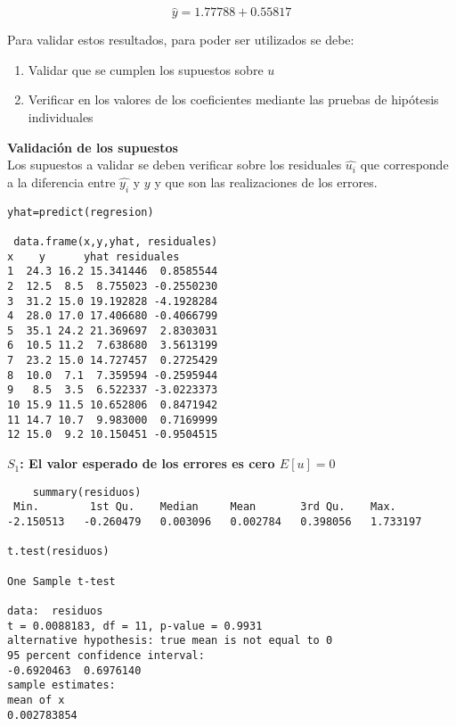 \documentclass[base=hide,12pt]{elegantbook}
\begin{document}
$$\widehat{y} = 1.77788 + 0.55817$$


Para validar estos resultados, para poder ser utilizados se debe:
\begin{enumerate}
	\item Validar que se cumplen los supuestos sobre $u$
	\item Verificar en los valores de los coeficientes mediante las pruebas de hipótesis individuales
\end{enumerate}

\vspace{.5cm}
\textcolor{col3}{\bf \large Validación de los supuestos}\\

Los supuestos a validar se deben verificar sobre los residuales $\widehat{u_{i}}$ que corresponde a la diferencia entre $\widehat{y_{i}}$ y $y$ y que son las realizaciones de los errores.

\begin{Box3}{}
\begin{verbatim}
yhat=predict(regresion)

 data.frame(x,y,yhat, residuales)
x    y      yhat residuales
1  24.3 16.2 15.341446  0.8585544
2  12.5  8.5  8.755023 -0.2550230
3  31.2 15.0 19.192828 -4.1928284
4  28.0 17.0 17.406680 -0.4066799
5  35.1 24.2 21.369697  2.8303031
6  10.5 11.2  7.638680  3.5613199
7  23.2 15.0 14.727457  0.2725429
8  10.0  7.1  7.359594 -0.2595944
9   8.5  3.5  6.522337 -3.0223373
10 15.9 11.5 10.652806  0.8471942
11 14.7 10.7  9.983000  0.7169999
12 15.0  9.2 10.150451 -0.9504515
\end{verbatim}	
\end{Box3}
\vspace{1cm}
\textcolor{col3}{\bf $S_1$: El valor esperado de los errores es cero $E[u]=0$}\\

\begin{Box3}{}
\begin{verbatim}
	summary(residuos)
 Min.        1st Qu.    Median     Mean       3rd Qu.    Max. 
-2.150513   -0.260479   0.003096   0.002784   0.398056   1.733197 

t.test(residuos)

One Sample t-test

data:  residuos
t = 0.0088183, df = 11, p-value = 0.9931
alternative hypothesis: true mean is not equal to 0
95 percent confidence interval:
-0.6920463  0.6976140
sample estimates:
mean of x 
0.002783854 
	
\end{verbatim}
\end{Box3}
\vspace{1cm}
\end{document}
